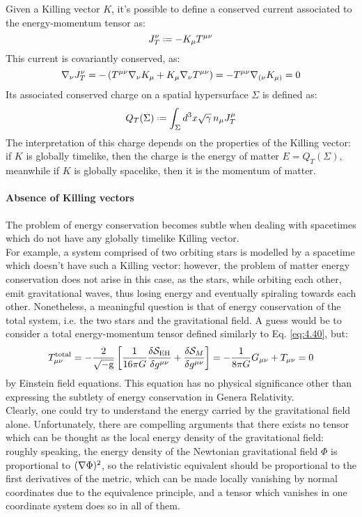 Given a Killing vector $ K $, it's possible to define a conserved current associated to the energy-momentum tensor as:
\begin{equation}
  J_T^\nu \defeq - K_\mu T^{\mu \nu}
  \label{eq:4.50}
\end{equation}
This current is covariantly conserved, as:
\begin{equation*}
  \nabla_\nu J_T^\nu = - \left( T^{\mu \nu} \nabla_\nu K_\mu + K_\mu \nabla_\nu T^{\mu \nu} \right) = - T^{\mu \nu} \nabla_{(\nu} K_{\mu)} = 0
\end{equation*}
Its associated conserved charge on a spatial hypersurface $ \Sigma $ is defined as:
\begin{equation}
  Q_T(\Sigma) \defeq \int_\Sigma d^3 x \sqrt{\gamma}\, n_\mu J_T^\mu
  \label{eq:4.51}
\end{equation}
The interpretation of this charge depends on the properties of the Killing vector: if $ K $ is globally timelike, then the charge is the energy of matter $ E = Q_T(\Sigma) $, meanwhile if $ K $ is globally spacelike, then it is the momentum of matter.

\paragraph{Absence of Killing vectors}

The problem of energy conservation becomes subtle when dealing with spacetimes which do not have any globally timelike Killing vector.\\
For example, a system comprised of two orbiting stars is modelled by a spacetime which doesn't have such a Killing vector: however, the problem of matter energy conservation does not arise in this case, as the stars, while orbiting each other, emit gravitational waves, thus losing energy and eventually spiraling towards each other. Nonetheless, a meaningful question is that of energy conservation of the total system, i.e. the two stars and the gravitational field. A guess would be to consider a total energy-momentum tensor defined similarly to Eq. \ref{eq:4.40}, but:
\begin{equation*}
  T^{\text{total}}_{\mu \nu} = - \frac{2}{\sqrt{-\mathrm{g}}} \left[ \frac{1}{16\pi G} \frac{\delta \mathcal{S}_{\text{EH}}}{\delta g^{\mu \nu}} + \frac{\delta \mathcal{S}_M}{\delta g^{\mu \nu}} \right] = - \frac{1}{8\pi G} G_{\mu \nu} + T_{\mu \nu} = 0
\end{equation*}
by Einstein field equations. This equation has no physical significance other than expressing the subtlety of energy conservation in Genera Relativity.\\
Clearly, one could try to understand the energy carried by the gravitational field alone. Unfortunately, there are compelling arguments that there exists no tensor which can be thought as the local energy density of the gravitational field: roughly speaking, the energy density of the Newtonian gravitational field $ \Phi $ is proportional to $ (\nabla \Phi)^2 $, so the relativistic equivalent should be proportional to the first derivatives of the metric, which can be made locally vanishing by normal coordinates due to the equivalence principle, and a tensor which vanishes in one coordinate system does so in all of them.

